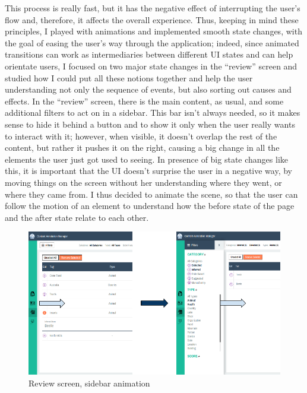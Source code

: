 \documentclass[12pt,svgnames]{memoir}
\begin{document}
This process is really fast, but it has the negative effect of
interrupting the user's flow and, therefore, it affects the overall
experience. Thus, keeping in mind these principles, I played with
animations and implemented smooth state changes, with the goal of easing
the user's way through the application; indeed, since animated
transitions can work as intermediaries between different UI states and
can help orientate users, I focused on two major state changes in the
``review'' screen and studied how I could put all these notions together
and help the user understanding not only the sequence of events, but
also sorting out causes and effects. In the ``review'' screen, there is
the main content, as usual, and some additional filters to act on in a
sidebar. This bar isn't always needed, so it makes sense to hide it
behind a button and to show it only when the user really wants to
interact with it; however, when visible, it doesn't overlap the rest of
the content, but rather it pushes it on the right, causing a big change
in all the elements the user just got used to seeing. In presence of big
state changes like this, it is important that the UI doesn't surprise
the user in a negative way, by moving things on the screen without her
understanding where they went, or where they came from. I thus decided
to animate the scene, so that the user can follow the motion of an
element to understand how the before state of the page and the after
state relate to each other.

\begin{figure}[htbp]
\centering
\includegraphics{./src/img/review-sidebar-animation.png}
\caption{Review screen, sidebar animation}
\end{figure}
\end{document}
